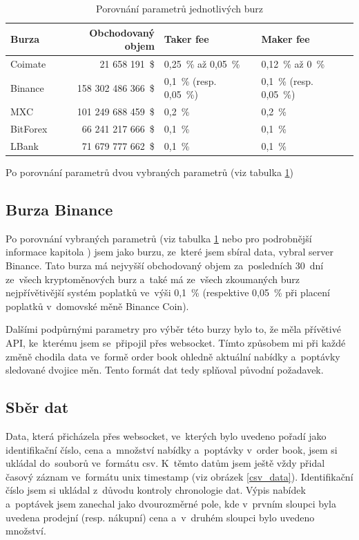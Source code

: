 \documentclass[thesis=B,czech]{FITthesis}[2019/03/21]
\begin{document}
\begin{table}\centering
     \caption{Porovnání parametrů jednotlivých burz}
     \label{exchanges_comparison}
     \begin{tabular}{||l | r | l | l||} 
     \hline
     Burza & Obchodovaný objem & Taker fee & Maker fee \\ [0.5ex]
     \hline\hline
     Coimate & 21 658 191~\$ & 0,25~\% až 0,05~\% & 0,12~\% až 0~\%  \\ 
     \hline
     Binance & 158 302 486 366~\$ & 0,1~\% (resp. 0,05~\%) & 0,1~\% (resp. 0,05~\%)  \\ 
     \hline
     MXC & 101 249 688 459~\$ & 0,2~\% & 0,2~\%  \\ 
     \hline
     BitForex & 66 241 217 666~\$ & 0,1~\% & 0,1~\%  \\ 
     \hline
     LBank & 71 679 777 662~\$ & 0,1~\% & 0,1~\%  \\ 
     \hline
    \end{tabular}
\end{table}
Po porovnání parametrů dvou vybraných parametrů (viz tabulka \ref{exchanges_comparison})

\subsection{Burza Binance}
Po porovnání vybraných parametrů (viz tabulka \ref{exchanges_comparison} nebo pro podrobnější informace kapitola ) jsem jako burzu, ze~které jsem sbíral data, vybral server Binance. Tato burza má nejvyšší obchodovaný objem za~posledních 30~dní ze~všech kryptoměnových burz \cite{coinmarketcap} a~také má ze~všech zkoumaných burz nejpřívětivější systém poplatků ve~výši 0,1~\% (respektive 0,05~\% při placení poplatků v~domovské měně Binance Coin).

Dalšími podpůrnými parametry pro výběr této burzy bylo to, že měla přívětivé API, ke~kterému jsem se~připojil přes websocket. \cite{BinanceApi} Tímto způsobem mi při každé změně chodila data ve~formě order book ohledně aktuální nabídky a~poptávky sledované dvojice měn. Tento formát dat tedy splňoval původní požadavek. \cite{BinanceApi}

\subsection{Sběr dat}
Data, která přicházela přes websocket, ve~kterých bylo uvedeno pořadí jako identifikační číslo, cena a~množství nabídky a~poptávky v~order book, jsem si ukládal do~souborů ve~formátu csv. K~těmto datům jsem ještě vždy přidal časový záznam ve~formátu unix timestamp (viz obrázek \ref{csv_data}). Identifikační číslo jsem si ukládal z~důvodu kontroly chronologie dat. Výpis nabídek a~poptávek jsem zanechal jako dvourozměrné pole, kde v~prvním sloupci byla uvedena prodejní (resp. nákupní) cena a~v~druhém sloupci bylo uvedeno množství.
\end{document}
